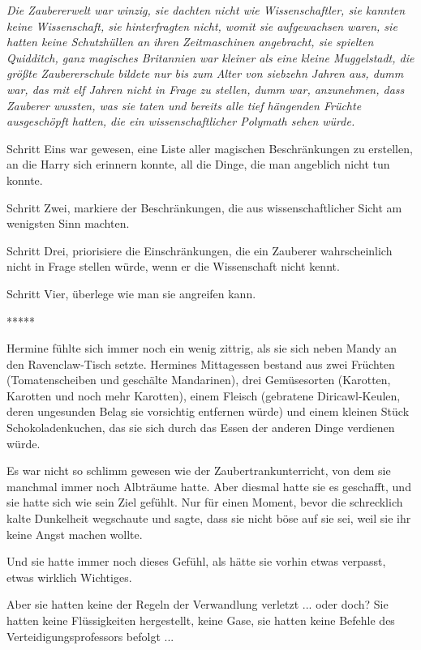 \emph{Die Zaubererwelt war winzig, sie dachten nicht wie Wissenschaftler, sie
kannten keine Wissenschaft, sie hinterfragten nicht, womit sie aufgewachsen
waren, sie hatten keine Schutzhüllen an ihren Zeitmaschinen angebracht, sie
spielten Quidditch, ganz magisches Britannien war kleiner als eine kleine
Muggelstadt, die größte Zaubererschule bildete nur bis zum Alter von siebzehn
Jahren aus, dumm war, das mit elf Jahren nicht in Frage zu stellen, dumm war,
anzunehmen, dass Zauberer wussten, was sie taten und bereits alle tief hängenden
Früchte ausgeschöpft hatten, die ein wissenschaftlicher Polymath sehen würde.}

Schritt Eins war gewesen, eine Liste aller magischen Beschränkungen zu
erstellen, an die Harry sich erinnern konnte, all die Dinge, die man angeblich
nicht tun konnte.

Schritt Zwei, markiere der Beschränkungen, die aus wissenschaftlicher Sicht am
wenigsten Sinn machten.

Schritt Drei, priorisiere die Einschränkungen, die ein Zauberer wahrscheinlich
nicht in Frage stellen würde, wenn er die Wissenschaft nicht kennt.

Schritt Vier, überlege wie man sie angreifen kann.

\begin{center}*****\end{center}

Hermine fühlte sich immer noch ein wenig zittrig, als sie sich neben Mandy an
den Ravenclaw-Tisch setzte. Hermines Mittagessen bestand aus zwei Früchten
(Tomatenscheiben und geschälte Mandarinen), drei Gemüsesorten (Karotten,
Karotten und noch mehr Karotten), einem Fleisch (gebratene Diricawl-Keulen,
deren ungesunden Belag sie vorsichtig entfernen würde) und einem kleinen Stück
Schokoladenkuchen, das sie sich durch das Essen der anderen Dinge verdienen
würde.

Es war nicht so schlimm gewesen wie der Zaubertrankunterricht, von dem sie
manchmal immer noch Albträume hatte. Aber diesmal hatte sie es geschafft, und
sie hatte sich wie sein Ziel gefühlt. Nur für einen Moment, bevor die
schrecklich kalte Dunkelheit wegschaute und sagte, dass sie nicht böse auf sie
sei, weil sie ihr keine Angst machen wollte.

Und sie hatte immer noch dieses Gefühl, als hätte sie vorhin etwas verpasst,
etwas wirklich Wichtiges.

Aber sie hatten keine der Regeln der Verwandlung verletzt ... oder doch? Sie
hatten keine Flüssigkeiten hergestellt, keine Gase, sie hatten keine Befehle des
Verteidigungsprofessors befolgt ...

